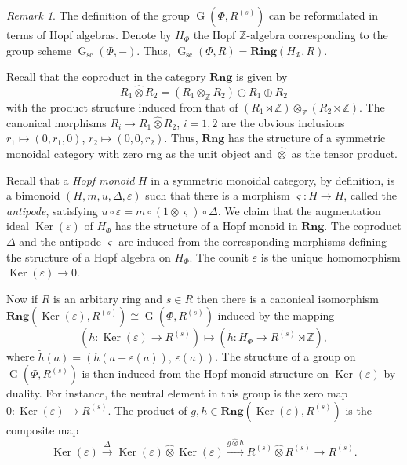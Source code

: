 \documentclass[oneside, 11pt]{amsart}
\numberwithin{equation}{section}
\theoremstyle{definition}
\theoremstyle{remark}
\newtheorem{rem}[lemma]{Remark}
\DeclareMathOperator\Ker{Ker}
\DeclareMathOperator\GG{G}
\newcommand{\Rng}{\mathbf{Rng}}
\newcommand{\ZZ}{\mathbb{Z}}
\newcommand{\otimeshat}{\mathbin{\widehat{\otimes}}}
\begin{document}
\begin{rem}
 The definition of the group $\GG(\Phi, R^{(s)})$ can be reformulated in terms of Hopf algebras. Denote by \(H_\Phi\) the Hopf \(\ZZ\)-algebra corresponding to the group scheme \(\GG_{\mathrm{sc}}(\Phi, -)\). Thus, $\GG_\mathrm{sc}(\Phi, R) = \mathbf{Ring}(H_\Phi, R)$.
 
 Recall that the coproduct in the category $\Rng$ is given by \[R_1 \otimeshat R_2 = (R_1 \otimes_{\ZZ} R_2) \oplus R_1 \oplus R_2\]
 with the product structure induced from that of $(R_1\rtimes\mathbb Z)\otimes_{\mathbb Z}(R_2\rtimes\mathbb Z)$. The canonical morphisms $R_i \to R_1 \otimeshat R_2$, $i=1,2$ are the obvious inclusions $r_1 \mapsto (0, r_1, 0)$, $r_2 \mapsto (0, 0, r_2)$.
 Thus, $\Rng$ has the structure of a symmetric monoidal category with zero rng as the unit object and $\otimeshat$ as the tensor product.

 Recall that a {\it Hopf monoid} $H$ in a symmetric monoidal category, by definition, is a bimonoid $(H, m, u, \Delta, \varepsilon)$ such that there is a morphism $\varsigma\colon H\to H$, called the {\it antipode}, satisfying $u \circ \varepsilon = m \circ (1 \otimes \varsigma) \circ \Delta$.
 We claim that the augmentation ideal \(\Ker(\varepsilon)\) of $H_\Phi$ has the structure of a Hopf monoid in \(\Rng\). The coproduct $\Delta$ and the antipode $\varsigma$ are induced from the corresponding morphisms defining the structure of a Hopf algebra on $H_\Phi$. The counit $\varepsilon$ is the unique homomorphism $\Ker(\varepsilon) \to 0$.
 
 Now if $R$ is an arbitary ring and $s \in R$ then there is a canonical isomorphism \(\Rng(\Ker(\varepsilon), R^{(s)}) \cong \GG(\Phi, R^{(s)})\) induced by the mapping 
 \[(h \colon \Ker(\varepsilon) \to R^{(s)}) \mapsto (\widetilde{h} \colon H_\Phi \to R^{(s)}\rtimes\ZZ), \]
 where $\widetilde{h}(a) = \left(h(a - \varepsilon(a)),\, \varepsilon(a)\right)$.
 The structure of a group on $\GG(\Phi, R^{(s)})$ is then induced from the Hopf monoid structure on $\Ker(\varepsilon)$ by duality.
 For instance, the neutral element in this group is the zero map \(0 \colon \Ker(\varepsilon) \to R^{(s)}\). The product of \(g, h \in \Rng(\Ker(\varepsilon), R^{(s)})\) is the composite map
 \[\Ker(\varepsilon) \xrightarrow{\Delta} \Ker(\varepsilon) \otimeshat \Ker(\varepsilon) \xrightarrow{g \otimeshat h} R^{(s)} \otimeshat R^{(s)} \to R^{(s)}.\]
\end{rem}
\end{document}
